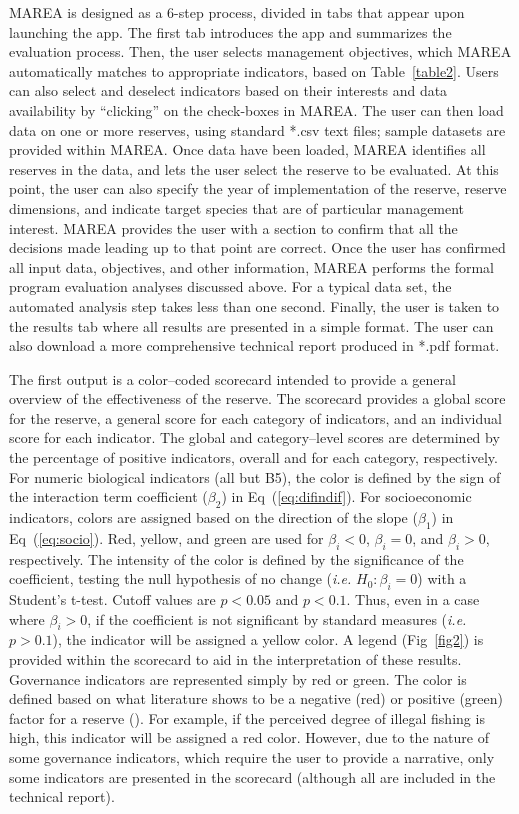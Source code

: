 \documentclass[10pt,letterpaper]{article}
\begin{document}
MAREA is designed as a 6-step process, divided in tabs that appear upon launching the app. The first tab introduces the app and summarizes the evaluation process. Then, the user selects management objectives, which MAREA automatically matches to appropriate indicators, based on Table~\ref{table2}. Users can also select and deselect indicators based on their interests and data availability by ``clicking'' on the check-boxes in MAREA. The user can then load data on one or more reserves, using standard *.csv text files; sample datasets are provided within MAREA. Once data have been loaded, MAREA identifies all reserves in the data, and lets the user select the reserve to be evaluated. At this point, the user can also specify the year of implementation of the reserve, reserve dimensions, and indicate target species that are of particular management interest. MAREA provides the user with a section to confirm that all the decisions made leading up to that point are correct. Once the user has confirmed all input data, objectives, and other information, MAREA performs the formal program evaluation analyses discussed above. For a typical data set, the automated analysis step takes less than one second. Finally, the user is taken to the results tab where all results are presented in a simple format. The user can also download a more comprehensive technical report produced in *.pdf format.

The first output is a color--coded scorecard intended to provide a general overview of the effectiveness of the reserve. The scorecard provides a global score for the reserve, a general score for each category of indicators, and an individual score for each indicator. The global and category--level scores are determined by the percentage of positive indicators, overall and for each category, respectively. For numeric biological indicators (all but B5), the color is defined by the sign of the interaction term coefficient (\(\beta_2\)) in Eq~(\ref{eq:difindif}). For socioeconomic indicators, colors are assigned based on the direction of the slope (\(\beta_1\)) in Eq~(\ref{eq:socio}). Red, yellow, and green are used for \(\beta_i<0\), \(\beta_i = 0\), and \(\beta_i>0\), respectively. The intensity of the color is defined by the significance of the coefficient, testing the null hypothesis of no change (\emph{i.e.} \(H_0: \beta_i = 0\)) with a Student's t-test. Cutoff values are \(p < 0.05\) and \(p < 0.1\). Thus, even in a case where \(\beta_i > 0\), if the coefficient is not significant by standard measures (\emph{i.e. } \(p>0.1\)), the indicator will be assigned a yellow color. A legend (Fig~\ref{fig2}) is provided within the scorecard to aid in the interpretation of these results. Governance indicators are represented simply by red or green. The color is defined based on what literature shows to be a negative (red) or positive (green) factor for a reserve (). For example, if the perceived degree of illegal fishing is high, this indicator will be assigned a red color. However, due to the nature of some governance indicators, which require the user to provide a narrative, only some indicators are presented in the scorecard (although all are included in the technical report).
\end{document}
